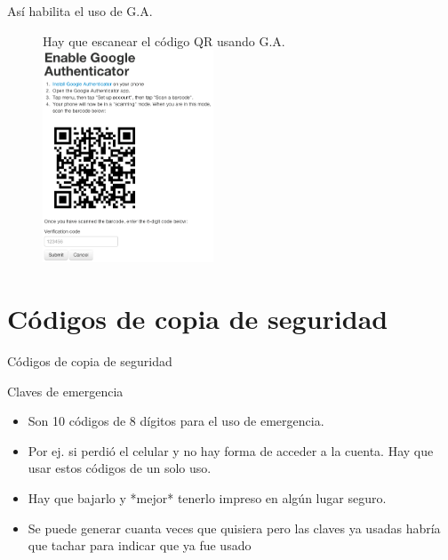 \documentclass[11pt]{beamer}
\begin{document}
\begin{frame}{As\'i habilita el uso de G.A.}
  \begin{figure}{Hay que escanear el c\'odigo QR usando G.A.}
    \includegraphics[width=2in]{enable-authenticator.png}
  \end{figure}
\end{frame}
\section{C\'odigos de copia de seguridad}
\begin{frame}{C\'odigos de copia de seguridad}
  \begin{block}{Claves de emergencia}
    \begin{itemize}
      \item Son 10 c\'odigos de 8 d\'igitos para el uso de emergencia.
      \item Por ej. si perdi\'o el celular y no hay forma de acceder a la cuenta. Hay que usar estos c\'odigos de un solo uso. 
      \item Hay que bajarlo y *mejor* tenerlo impreso en alg\'un lugar seguro.
      \item Se puede generar cuanta veces que quisiera pero las claves ya usadas habr\'ia que tachar para indicar que ya fue usado
    \end{itemize}
  \end{block}
\end{frame}
\end{document}
